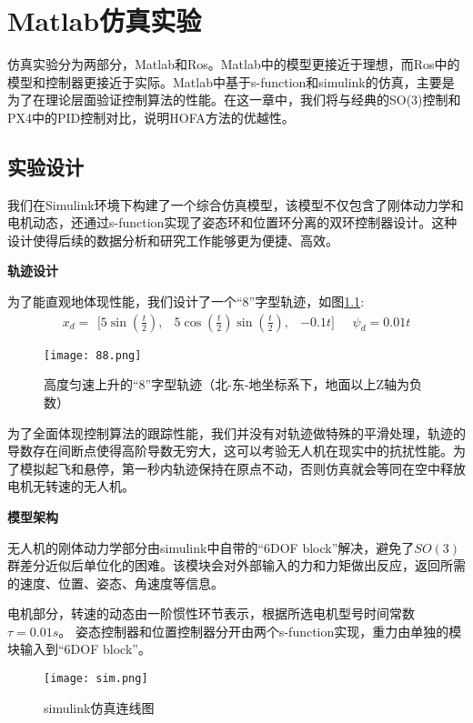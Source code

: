 \chapter{Matlab仿真实验}
仿真实验分为两部分，Matlab和Ros。Matlab中的模型更接近于理想，而Ros中的模型和控制器更接近于实际。Matlab中基于s-function和simulink的仿真，主要是为了在理论层面验证控制算法的性能。在这一章中，我们将与经典的SO(3)控制和PX4中的PID控制对比，说明HOFA方法的优越性。



\section{实验设计}
我们在Simulink环境下构建了一个综合仿真模型，该模型不仅包含了刚体动力学和电机动态，还通过s-function实现了姿态环和位置环分离的双环控制器设计。这种设计使得后续的数据分析和研究工作能够更为便捷、高效。

\textbf{轨迹设计}

为了能直观地体现性能，我们设计了一个“8”字型轨迹，如图\ref{fig:8}:
$$x_d = \begin{matrix}[5\sin(\frac{t}{2}), & 5\cos(\frac{t}{2})\sin(\frac{t}{2}), &-0.1t]\end{matrix}
\quad
\psi_d=0.01t$$

\begin{figure}[!h]
  \centering
  \texttt{[image: 88.png]}
  \caption{高度匀速上升的“8”字型轨迹（北-东-地坐标系下，地面以上Z轴为负数）}
  \label{fig:8}
\end{figure}

为了全面体现控制算法的跟踪性能，我们并没有对轨迹做特殊的平滑处理，轨迹的导数存在间断点使得高阶导数无穷大，这可以考验无人机在现实中的抗扰性能。为了模拟起飞和悬停，第一秒内轨迹保持在原点不动，否则仿真就会等同在空中释放电机无转速的无人机。

\textbf{模型架构}

  无人机的刚体动力学部分由simulink中自带的“6DOF block”解决，避免了$SO(3)$群差分近似后单位化的困难。该模块会对外部输入的力和力矩做出反应，返回所需的速度、位置、姿态、角速度等信息。

  电机部分，转速的动态由一阶惯性环节表示，根据所选电机型号时间常数$\tau=0.01s$。
  姿态控制器和位置控制器分开由两个s-function实现，重力由单独的模块输入到“6DOF block”。
  \begin{figure}[!h]
    \centering
    \texttt{[image: sim.png]}
    \caption{simulink仿真连线图}
    \label{fig:sim}
  \end{figure}


